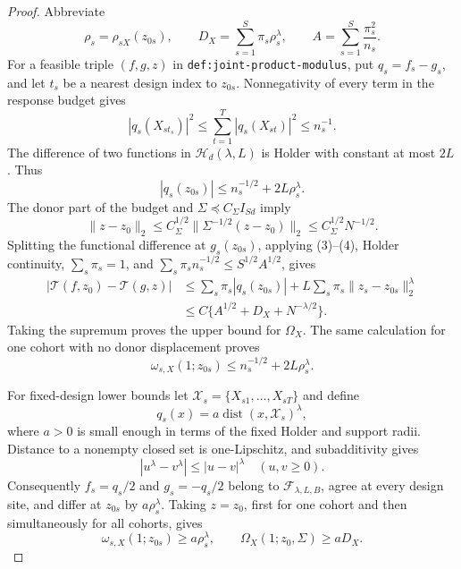 \documentclass{article}
\begin{document}
\begin{proof}
Abbreviate
\[
 \rho_s=\rho_{sX}(z_{0s}),
 \qquad D_X=\sum_{s=1}^{S}\pi_s\rho_s^\lambda,
 \qquad A=\sum_{s=1}^{S}\frac{\pi_s^2}{n_s}.               \tag{1}
\]
For a feasible triple \((f,g,z)\) in
\texttt{def:joint-product-modulus}, put \(q_s=f_s-g_s\), and let \(t_s\) be a nearest design index to \(z_{0s}\).  Nonnegativity of every term in the response budget gives
\[
 |q_s(X_{st_s})|^2
 \le\sum_{t=1}^{T}|q_s(X_{st})|^2\le n_s^{-1}.             \tag{2}
\]
The difference of two functions in \(\mathcal H_d(\lambda,L)\) is Holder with constant at most \(2L\).  Thus
\[
 |q_s(z_{0s})|
 \le n_s^{-1/2}+2L\rho_s^\lambda.                          \tag{3}
\]
The donor part of the budget and \(\Sigma\preceq C_\Sigma I_{Sd}\) imply
\[
 \|z-z_0\|_2
 \le C_\Sigma^{1/2}\|\Sigma^{-1/2}(z-z_0)\|_2
 \le C_\Sigma^{1/2}N^{-1/2}.                              \tag{4}
\]
Splitting the functional difference at \(g_s(z_{0s})\), applying (3)--(4), Holder continuity, \(\sum_s\pi_s=1\), and
\(\sum_s\pi_sn_s^{-1/2}\le S^{1/2}A^{1/2}\), gives
\[
\begin{aligned}
 |\mathcal T(f,z_0)-\mathcal T(g,z)|
 &\le\sum_s\pi_s|q_s(z_{0s})|
      +L\sum_s\pi_s\|z_s-z_{0s}\|_2^\lambda\\
 &\le C\{A^{1/2}+D_X+N^{-\lambda/2}\}.
\end{aligned}                                               \tag{5}
\]
Taking the supremum proves the upper bound for \(\Omega_X\).  The same calculation for one cohort with no donor displacement proves
\[
 \omega_{s,X}(1;z_{0s})
 \le n_s^{-1/2}+2L\rho_s^\lambda.                          \tag{6}
\]

For fixed-design lower bounds let
\(\mathcal X_s=\{X_{s1},\ldots,X_{sT}\}\) and define
\[
 q_s(x)=a\operatorname{dist}(x,\mathcal X_s)^\lambda,      \tag{7}
\]
where \(a>0\) is small enough in terms of the fixed Holder and support radii.  Distance to a nonempty closed set is one-Lipschitz, and subadditivity gives
\[
 |u^\lambda-v^\lambda|\le|u-v|^\lambda
 \quad(u,v\ge0).                                           \tag{8}
\]
Consequently \(f_s=q_s/2\) and \(g_s=-q_s/2\) belong to
\(\mathcal F_{\lambda,L,B}\), agree at every design site, and differ at \(z_{0s}\) by \(a\rho_s^\lambda\).  Taking \(z=z_0\), first for one cohort and then simultaneously for all cohorts, gives
\[
 \omega_{s,X}(1;z_{0s})\ge a\rho_s^\lambda,
 \qquad
 \Omega_X(1;z_0,\Sigma)\ge aD_X.                           \tag{9}
\]


\end{proof}
\end{document}
